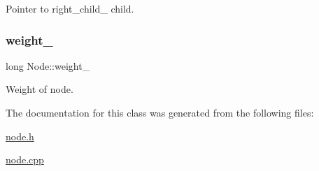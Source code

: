 Pointer to right\+\_\+child\+\_\+ child. 

\mbox{\label{class_node_ae19ed1e78bfaf9ae1c33462d878116e2}} 
\subsubsection{\texorpdfstring{weight\+\_\+}{weight\_}}
{\footnotesize\ttfamily long Node\+::weight\+\_\+\hspace{0.3cm}{\ttfamily [protected]}}



Weight of node. 



The documentation for this class was generated from the following files\+:\begin{DoxyCompactItemize}
\item 
\hyperlink{node_8h}{node.\+h}\item 
\hyperlink{node_8cpp}{node.\+cpp}\end{DoxyCompactItemize}
